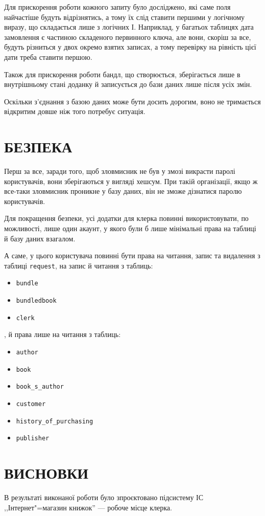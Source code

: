 \documentclass[a4paper,notitlepage,headsepline,pdftex,oneside]{report}
\newcommand{\setfontsize}[1]{\fontsize{#1pt}{#1pt}\selectfont}
\newcommand{\Chapter}[1]{\chapter{#1} \renewcommand{\baselinestretch}{1.5}\setfontsize{14pt}}
\newcommand{\uchapter}[1]{\chapter*{#1}\pagestyle{fancy}\renewcommand{\baselinestretch}{1.5}\setfontsize{14pt}\addcontentsline{toc}{chapter}{#1}}
\begin{document}
    Для прискорення роботи кожного запиту було досліджено, які саме поля
    найчастіше будуть відрізнятись, а тому їх слід ставити першими у логічному
    виразу, що складається лише з логічних І.
    Наприклад, у багатьох таблицях дата замовлення є частиною складеного
    первинного ключа, але вони, скоріш за все, будуть різниться у двох окремо
    взятих записах, а тому перевірку на рівність цієї дати треба ставити
    першою.

    Також для прискорення роботи бандл, що створюється, зберігається лише в
    внутрішньому стані доданку й записується до бази даних лише після усіх
    змін.

    Оскільки з’єднання з базою даних може бути досить дорогим, воно не
    тримається відкритим довше ніж того потребує ситуація.
    \clearpage
\Chapter{БЕЗПЕКА}
  Перш за все, заради того, щоб зловмисник не був у змозі викрасти паролі
  користувачів, вони зберігаються у вигляді хешсум.
  При такій організації, якщо ж все-таки зловмисник проникне у базу даних, він
  не зможе дізнатися паролю користувачів.

  Для покращення безпеки, усі додатки для клерка повинні використовувати, по
  можливості, лише один акаунт, у якого були б лише мінімальні права на
  таблиці й базу даних взагалом.

  А саме, у цього користувача повинні бути права на читання, запис та
  видалення з таблиці \texttt{request}, на запис й читання з таблиць:
  \begin{itemize}
    \item \texttt{bundle}
    \item \texttt{bundledbook}
    \item \texttt{clerk}
  \end{itemize},
  й права лише на читання з таблиць:
  \begin{itemize}
    \item \texttt{author}
    \item \texttt{book}
    \item \texttt{book\_s\_author}
    \item \texttt{customer}
    \item \texttt{history\_of\_purchasing}
    \item \texttt{publisher}
  \end{itemize}

\uchapter{ВИСНОВКИ}
  В результаті виконаної роботи було зпроєктовано підсистему ІС
  ,,Інтернет"=магазин книжок'' --- робоче місце клерка.
\end{document}
